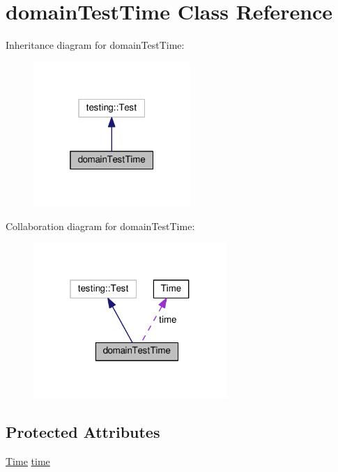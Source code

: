 \hypertarget{classdomainTestTime}{}\section{domain\+Test\+Time Class Reference}
\label{classdomainTestTime}


Inheritance diagram for domain\+Test\+Time\+:
\nopagebreak
\begin{figure}[H]
\begin{center}
\leavevmode
\includegraphics[width=169pt]{classdomainTestTime__inherit__graph}
\end{center}
\end{figure}


Collaboration diagram for domain\+Test\+Time\+:
\nopagebreak
\begin{figure}[H]
\begin{center}
\leavevmode
\includegraphics[width=208pt]{classdomainTestTime__coll__graph}
\end{center}
\end{figure}
\subsection*{Protected Attributes}
\begin{DoxyCompactItemize}
\item 
\hyperlink{classTime}{Time} \hyperlink{classdomainTestTime_a9eee3a6a359895396c122cc18ded5d36}{time}
\end{DoxyCompactItemize}



